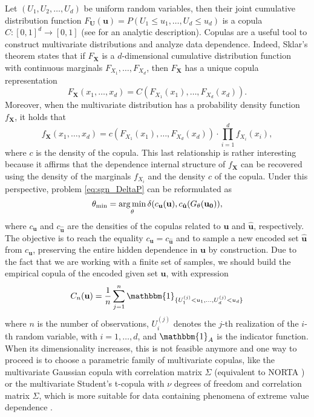 Let $(U_1,U_2,\dots,U_d)$ be uniform random variables, then their joint cumulative distribution function $F_{\mathbf{U}}(\mathbf{u}) = P(U_1\leq u_1, \dots, U_d \leq u_d)$ is a copula $C:[0,1]^d \rightarrow [0,1]$ (see \cite{Nelsen2006} for an analytic description). Copulas are a useful tool to construct multivariate distributions and analyze data dependence. Indeed, Sklar's theorem \cite{Sklar} states that if $F_{\mathbf{X}}$ is a $d$-dimensional cumulative distribution function with continuous marginals $F_{X_1},\dots,F_{X_d}$, then $F_{\mathbf{X}}$ has a unique copula representation
\begin{equation}
F_{\mathbf{X}}(x_1,\dots,x_d) = C(F_{X_1}(x_1),\dots,F_{X_d}(x_d)).
\label{eq:sgn_SklarF}
\end{equation}
Moreover, when the multivariate distribution has a probability density function $f_{\mathbf{X}}$, it holds that
\begin{equation}
f_{\mathbf{X}}(x_1,\dots,x_d) = c(F_{X_1}(x_1),\dots,F_{X_d}(x_d))\cdot \prod_{i=1}^{d}{f_{X_i}(x_i)},
\label{eq:sgn_Sklarf}
\end{equation}
where $c$ is the density of the copula. This last relationship is rather interesting because it affirms that the dependence internal structure of $f_{\mathbf{X}}$ can be recovered using the density of the marginals $f_{X_i}$ and the density $c$ of the copula. Under this perspective, problem \eqref{eq:sgn_DeltaP} can be reformulated as
\begin{equation}
\theta_{\min} = \operatorname*{arg\,min}_{\theta} \delta(c_{\mathbf{u}}(\mathbf{u}), c_{\mathbf{\hat{u}}}(G_{\theta}(\mathbf{u_0})),
\label{eq:sgn_DeltaC}
\end{equation}
where $c_{\mathbf{u}}$ and $c_{\mathbf{\hat{u}}}$ are the densities of the copulas related to $\mathbf{u}$ and $\mathbf{\hat{u}}$, respectively. The objective is to reach the equality $c_{\mathbf{u}}=c_{\mathbf{\hat{u}}}$ and to sample a new encoded set $\mathbf{\hat{u}}$ from $c_{\mathbf{u}}$, preserving the entire hidden dependence in $\mathbf{u}$ by construction.
Due to the fact that we are working with a finite set of samples, we should build the empirical copula of the encoded given set $\mathbf{u}$, with expression
\begin{equation}
C_n(\mathbf{u}) = \frac{1}{n}\sum_{j=1}^{n}{\mathbbm{1}_{\{U_{1}^{(j)} < u_1, \dots, U_{d}^{(j)} < u_d\}}}
\end{equation}
where $n$ is the number of observations, $U_{i}^{(j)}$ denotes the $j$-th realization of the $i$-th random variable, with $i=1,\dots,d$, and $\mathbbm{1}_A$ is the indicator function. When its dimensionality increases, this is not feasible anymore and one way to proceed is to choose a parametric family of multivariate copulas, like the multivariate Gaussian copula with correlation matrix $\Sigma$ (equivalent to NORTA \cite{Bedford2016}) or the multivariate Student's t-copula with $\nu$ degrees of freedom and correlation matrix $\Sigma$, which is more suitable for data containing phenomena of extreme value dependence \cite{t-copula}. 
